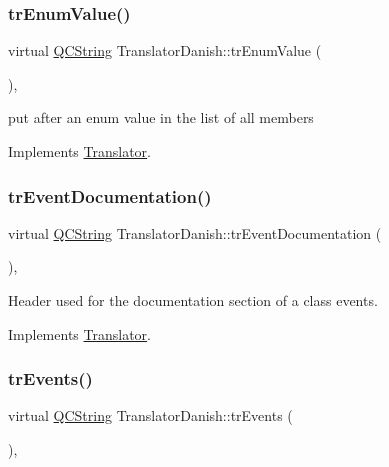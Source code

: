 \subsubsection{\texorpdfstring{trEnumValue()}{trEnumValue()}}
{\footnotesize\ttfamily virtual \mbox{\hyperlink{class_q_c_string}{Q\+C\+String}} Translator\+Danish\+::tr\+Enum\+Value (\begin{DoxyParamCaption}{ }\end{DoxyParamCaption})\hspace{0.3cm}{\ttfamily [inline]}, {\ttfamily [virtual]}}

put after an enum value in the list of all members 

Implements \mbox{\hyperlink{class_translator}{Translator}}.

\mbox{\label{class_translator_danish_a2848147167e0fcc24a293ffa5ba63b34}} 
\subsubsection{\texorpdfstring{trEventDocumentation()}{trEventDocumentation()}}
{\footnotesize\ttfamily virtual \mbox{\hyperlink{class_q_c_string}{Q\+C\+String}} Translator\+Danish\+::tr\+Event\+Documentation (\begin{DoxyParamCaption}{ }\end{DoxyParamCaption})\hspace{0.3cm}{\ttfamily [inline]}, {\ttfamily [virtual]}}

Header used for the documentation section of a class\textquotesingle{} events. 

Implements \mbox{\hyperlink{class_translator}{Translator}}.

\mbox{\label{class_translator_danish_adc3dc4dd23171bced014aafbd5593081}} 
\subsubsection{\texorpdfstring{trEvents()}{trEvents()}}
{\footnotesize\ttfamily virtual \mbox{\hyperlink{class_q_c_string}{Q\+C\+String}} Translator\+Danish\+::tr\+Events (\begin{DoxyParamCaption}{ }\end{DoxyParamCaption})\hspace{0.3cm}{\ttfamily [inline]}, {\ttfamily [virtual]}}

